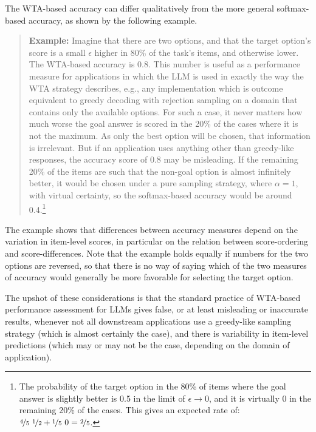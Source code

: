 \documentclass[fleqn]{article}
\begin{document}
The WTA-based accuracy can differ qualitatively from the more general softmax-based accuracy, as shown by the following example.
%
\begin{quote}
  \textbf{Example:}
  Imagine that there are two options, and that the target option's score is a small $\epsilon$ higher in 80\% of the task's items, and otherwise lower.
  The WTA-based accuracy is 0.8.
  This number is useful as a performance measure for applications in which the LLM is used in exactly the way the WTA strategy describes, e.g., any implementation which is outcome equivalent to greedy decoding with rejection sampling on a domain that contains only the available options.
  For such a case, it never matters how much worse the goal answer is scored in the 20\% of the cases where it is not the maximum.
  As only the best option will be chosen, that information is irrelevant.
  But if an application uses anything other than greedy-like responses, the accuracy score of 0.8 may be misleading.
  If the remaining 20\% of the items are such that the non-goal option is almost infinitely better, it would be chosen under a pure sampling strategy, where $\alpha = 1$, with virtual certainty, so the softmax-based accuracy would be around 0.4.\footnote{The probability of the target option in the 80\% of items where the goal answer is slightly better is 0.5 in the limit of $\epsilon \rightarrow 0$, and it is virtually 0 in the remaining 20\% of the cases. This gives an expected rate of: $\nicefrac{4}{5} \ \nicefrac{1}{2} + \nicefrac{1}{5} \ 0 = \nicefrac{2}{5}$.}
\end{quote}
%
The example shows that differences between accuracy measures depend on the variation in item-level scores, in particular on the relation between score-ordering and score-differences.
Note that the example holds equally if numbers for the two options are reversed, so that there is no way of saying which of the two measures of accuracy would generally be more favorable for selecting the target option.

The upshot of these considerations is that the standard practice of WTA-based performance assessment for LLMs gives false, or at least misleading or inaccurate results, whenever not all downstream applications use a greedy-like sampling strategy (which is almost certainly the case), and there is variability in item-level predictions (which may or may not be the case, depending on the domain of application).
\end{document}
